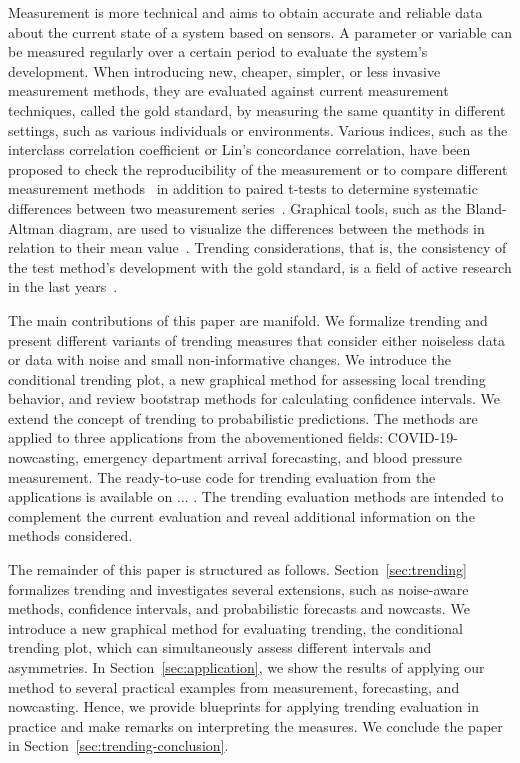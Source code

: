 \documentclass[pdflatex]{sn-jnl}
\theoremstyle{plain}%
\theoremstyle{definition}
\begin{document}
Measurement is more technical and aims to obtain accurate and reliable data about the current state of a system based on sensors.
A parameter or variable can be measured regularly over a certain period to evaluate the system's development.
When introducing new, cheaper, simpler, or less invasive measurement methods, they are evaluated against current measurement techniques, called the gold standard, by measuring the same quantity in different settings, such as various individuals or environments.
Various indices, such as the interclass correlation coefficient or Lin's concordance correlation, have been proposed to check the reproducibility of the measurement or to compare different measurement methods~\citep{lawrence1989concordance,koo2016guideline} in addition to paired t-tests to determine systematic differences between two measurement series~\citep{watson2010method}.
Graphical tools, such as the Bland-Altman diagram, are used to visualize the differences between the methods in relation to their mean value~\citep{bland1986statistical}.
Trending considerations, that is, the consistency of the test method's development with the gold standard, is a field of active research in the last years~\citep{Saugel2015,saugel2018error,hiraishi2021concordance}.

The main contributions of this paper are manifold.
We formalize trending and present different variants of trending measures that consider either noiseless data or data with noise and small non-informative changes.
We introduce the conditional trending plot, a new graphical method for assessing local trending behavior, and review bootstrap methods for calculating confidence intervals.
We extend the concept of trending to probabilistic predictions.
The methods are applied to three applications from the abovementioned fields: COVID-19-nowcasting, emergency department arrival forecasting, and blood pressure measurement.
The ready-to-use code for trending evaluation from the applications is available on ... .
The trending evaluation methods are intended to complement the current evaluation and reveal additional information on the methods considered.

The remainder of this paper is structured as follows.
Section~\ref{sec:trending} formalizes trending and investigates several extensions, such as noise-aware methods, confidence intervals, and probabilistic forecasts and nowcasts.
We introduce a new graphical method for evaluating trending, the conditional trending plot, which can simultaneously assess different intervals and asymmetries.
In Section~\ref{sec:application}, we show the results of applying our method to several practical examples from measurement, forecasting, and nowcasting.
Hence, we provide blueprints for applying trending evaluation in practice and make remarks on interpreting the measures.
We conclude the paper in Section~\ref{sec:trending-conclusion}.
\end{document}
